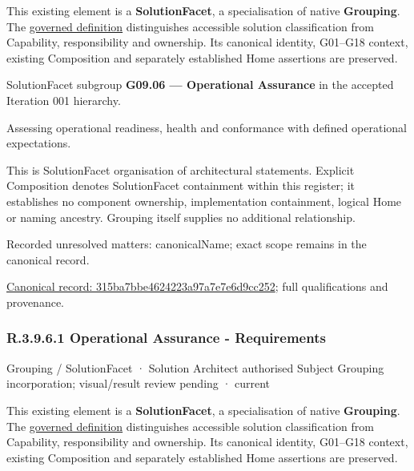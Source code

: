 This existing element is a \textbf{SolutionFacet}, a specialisation of native
\textbf{Grouping}. The \href{\detokenize{../../../../../../../governance/continuum-representation.md#solutionfacet-classification--1119-candidate}}{governed definition}
distinguishes accessible solution classification from Capability, responsibility
and ownership. Its canonical identity, G01–G18 context, existing Composition
and separately established Home assertions are preserved.



SolutionFacet subgroup \textbf{G09.06 — Operational Assurance} in the accepted Iteration 001 hierarchy.



Assessing operational readiness, health and conformance with defined operational expectations.



This is SolutionFacet organisation of architectural statements. Explicit Composition denotes SolutionFacet containment within this register; it establishes no component ownership, implementation containment, logical Home or naming ancestry. Grouping itself supplies no additional relationship.


{\small Recorded unresolved matters: canonicalName; exact scope remains in the canonical record.}\par
{\footnotesize \href{../../../../../../../continuum/grouping/315ba7bbe4624223a97a7e7e6d9cc252.md}{Canonical record: 315ba7bbe4624223a97a7e7e6d9cc252}; full qualifications and provenance.}\par
\subsubsection*{R.3.9.6.1 Operational Assurance - Requirements}
\label{navigation:R.3.9.6.1}

\label{element:3189d80ed4c24efe9bfc6b28ab263b51}
{\small Grouping / SolutionFacet · Solution Architect authorised Subject Grouping incorporation; visual/result review pending · current}\par

This existing element is a \textbf{SolutionFacet}, a specialisation of native
\textbf{Grouping}. The \href{\detokenize{../../../../../../../governance/continuum-representation.md#solutionfacet-classification--1119-candidate}}{governed definition}
distinguishes accessible solution classification from Capability, responsibility
and ownership. Its canonical identity, G01–G18 context, existing Composition
and separately established Home assertions are preserved.



